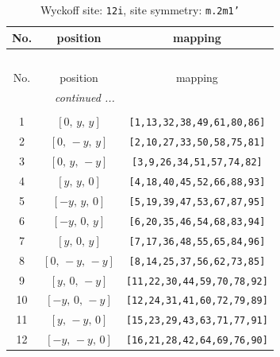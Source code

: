 \documentclass[fleqn,8pt]{jsarticle}
\begin{document}
\begin{longtable}{ccc}
\caption{Wyckoff site: {\tt 12i}, site symmetry: {\tt m.2m1'}}
 \\
 \hline \hline
No. & position & mapping \\ \hline \endfirsthead

\multicolumn{2}{l}{\tablename\ \thetable{}} \\
 \hline \hline
No. & position & mapping \\ \hline \endhead

 \hline \hline
\multicolumn{2}{r}{\footnotesize\it continued ...} \\ \endfoot

 \hline \hline
\multicolumn{2}{r}{} \\ \endlastfoot

1 & $\left[ 0,\, y,\, y \right]$ & {\tt [1,13,32,38,49,61,80,86]} \\ \hline
2 & $\left[ 0,\, - y,\, y \right]$ & {\tt [2,10,27,33,50,58,75,81]} \\ \hline
3 & $\left[ 0,\, y,\, - y \right]$ & {\tt [3,9,26,34,51,57,74,82]} \\ \hline
4 & $\left[ y,\, y,\, 0 \right]$ & {\tt [4,18,40,45,52,66,88,93]} \\ \hline
5 & $\left[ - y,\, y,\, 0 \right]$ & {\tt [5,19,39,47,53,67,87,95]} \\ \hline
6 & $\left[ - y,\, 0,\, y \right]$ & {\tt [6,20,35,46,54,68,83,94]} \\ \hline
7 & $\left[ y,\, 0,\, y \right]$ & {\tt [7,17,36,48,55,65,84,96]} \\ \hline
8 & $\left[ 0,\, - y,\, - y \right]$ & {\tt [8,14,25,37,56,62,73,85]} \\ \hline
9 & $\left[ y,\, 0,\, - y \right]$ & {\tt [11,22,30,44,59,70,78,92]} \\ \hline
10 & $\left[ - y,\, 0,\, - y \right]$ & {\tt [12,24,31,41,60,72,79,89]} \\ \hline
11 & $\left[ y,\, - y,\, 0 \right]$ & {\tt [15,23,29,43,63,71,77,91]} \\ \hline
12 & $\left[ - y,\, - y,\, 0 \right]$ & {\tt [16,21,28,42,64,69,76,90]} \\
\end{longtable}
\renewcommand{\arraystretch}{1.2}
\end{document}
